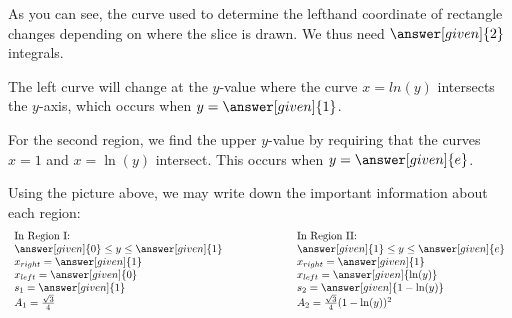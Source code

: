 \documentclass{ximera}
\begin{document}
\begin{example}
\begin{explanation}
\begin{image}
            \end{image}
            
            
As you can see, the curve used to determine the lefthand coordinate of rectangle changes depending on where the slice is drawn. We thus need $\answer[given]{2}$ integrals.

The left curve will change at the $y$-value where the curve $x=ln(y)$ intersects the $y$-axis, which occurs when $y=\answer[given]{1}$.  

For the second region, we find the upper $y$-value by requiring that the curves $x=1$ and $x=\ln(y)$ intersect. This occurs when $y=\answer[given]{e}$.

Using the picture above, we may write down the important information about each region: 
\[
\begin{array}{ll}
\text{In Region I:}  & \text{In Region II:}  \\
\answer[given]{0} \le y \le \answer[given]{1}  \qquad \qquad \qquad & \answer[given]{1} \le y \le \answer[given]{e}\\
x_{right} = \answer[given]{1}    &  x_{right} = \answer[given]{1} \\
x_{left} = \answer[given]{0}  & x_{left} = \answer[given]{\ln(y)} \\
s_1= \answer[given]{1} & s_2= \answer[given]{1-\ln(y)} \\
A_1 = \frac{\sqrt{3}}{4} &  A_2  = \frac{\sqrt{3}}{4}(1-\ln(y))^2 \\
\end{array}
\]


\end{explanation}
\end{example}
\end{document}
